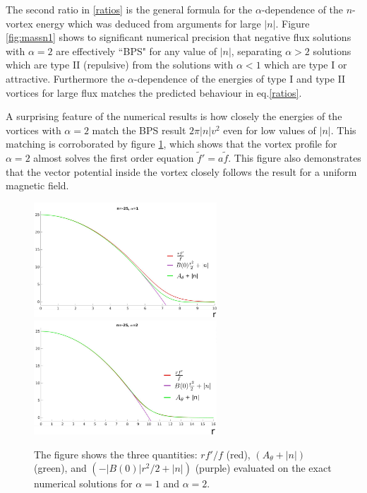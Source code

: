 The second ratio in \eqref{ratios} is the general formula for the $\alpha$-dependence of the $n$-vortex energy which was deduced from arguments for large $|n|$. Figure \ref{fig:massn1} shows to significant numerical precision that negative flux solutions with $\alpha=2$ are effectively ``BPS" for any value of  $|n|$, separating $\alpha> 2$ solutions which are type II (repulsive) from the solutions with $\alpha < 1$ which are type I or attractive. Furthermore the $\alpha$-dependence of the energies of type I and type II vortices for large flux matches the predicted behaviour in eq.\eqref{ratios}. 

A surprising feature of the numerical results is how closely the energies of the vortices with $\alpha=2$  match the BPS result $2\pi |n| v^2$ even for low values of $|n|$. This matching is corroborated by  figure \ref{fig:firstorder}, which shows that the vortex profile for $\alpha=2$  almost solves the first order equation $\tilde f' = a \tilde f$. This figure also demonstrates that the vector potential inside the vortex closely follows the result for a uniform magnetic field.
\begin{figure}[H]
\begin{center}
    \includegraphics[width=2.70in]{Chapter_2_Folder_1912.11321/figures/firstorderalpha1_corrected.pdf} \hspace{0.1in}
      \includegraphics[width=2.7in]{Chapter_2_Folder_1912.11321/figures/firstorderalpha2_corrected.pdf} 
    \caption[\textcolor{red}{This figure shows three quantities that ought to match in the BPS vortex.}]{{\small The figure shows the three quantities: $rf'/f$ (red), $\left(A_\theta+|n|\right)$ (green), and $\left(-|B(0)|r^2/2+|n|\right)$ (purple) evaluated on the exact numerical solutions for $\alpha=1$ and $\alpha=2$.}} \label{fig:firstorder}
    \end{center}
\end{figure}
